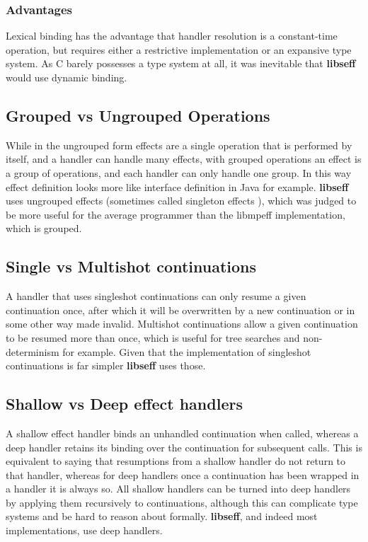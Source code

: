 \documentclass[logo,bsc,singlespacing,parskip,online]{infthesis}
\begin{document}
\subsubsection{Advantages}
Lexical binding has the advantage that handler resolution is a constant-time operation, but requires either a restrictive implementation or an expansive type system. As C barely possesses a type system at all, it was inevitable that \textbf{libseff} would use dynamic binding.

\subsection{Grouped vs Ungrouped Operations}

While in the ungrouped form effects are a single operation that is performed by itself, and a handler can handle many effects, with grouped operations an effect is a group of operations, and each handler can only handle one group. In this way effect definition looks more like interface definition in Java for example. \textbf{libseff} uses ungrouped effects (sometimes called singleton effects \citep{effekt-website}), which was judged to be more useful for the average programmer than the libmpeff implementation, which is grouped.

\subsection{Single vs Multishot continuations}

A handler that uses singleshot continuations can only resume a given continuation once, after which it will be overwritten by a new continuation or in some other way made invalid. Multishot continuations allow a given continuation to be resumed more than once, which is useful for tree searches and non-determinism for example. Given that the implementation of singleshot continuations is far simpler \textbf{libseff} uses those.

\subsection{Shallow vs Deep effect handlers}

A shallow effect handler binds an unhandled continuation when called, whereas a deep handler retains its binding over the continuation for subsequent calls. This is equivalent to saying that resumptions from a shallow handler do not return to that handler, whereas for deep handlers once a continuation has been wrapped in a handler it is always so. All shallow handlers can be turned into deep handlers by applying them recursively to continuations, although this can complicate type systems and be hard to reason about formally. \textbf{libseff}, and indeed most implementations, use deep handlers.
\end{document}
